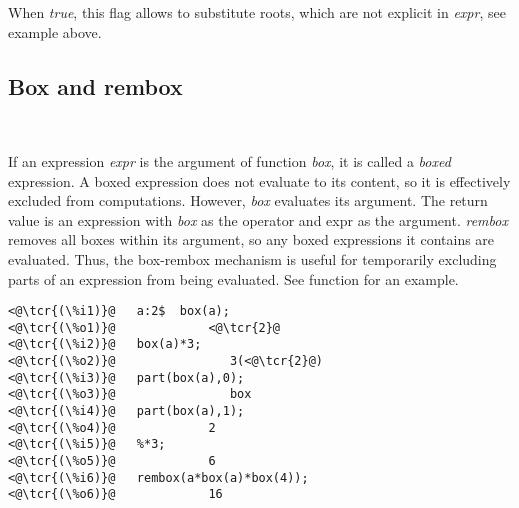 \documentclass[../Maxima_Workbook.tex]{subfiles}
\begin{document}
\lzz{} \qquad {} \hfill {}

\lz When \emph{true}, this flag allows  to substitute roots, which are not explicit in \emph{expr}, see example above.

\subsection{Box and rembox}

\lz {} \hfill \tcr{[function]} \\
 \hfill \tcr{[function]}

\lz If an expression \emph{expr} is the argument of function \emph{box}, it is called a \emph{boxed} expression. A boxed expression does not evaluate to its content, so it is effectively excluded from computations. However, \emph{box} evaluates its argument. The return value is an expression with \emph{box} as the operator and expr as the argument. \emph{rembox} removes all boxes within its argument, so any boxed expressions it contains are evaluated. Thus, the box-rembox mechanism is useful for temporarily excluding parts of an expression from being evaluated. See function  for an example.

\lz \begin{lstlisting}
<@\tcr{(\%i1)}@   a:2$  box(a);
<@\tcr{(\%o1)}@				<@\tcr{2}@
<@\tcr{(\%i2)}@   box(a)*3;
<@\tcr{(\%o2)}@			       3(<@\tcr{2}@)
<@\tcr{(\%i3)}@   part(box(a),0);
<@\tcr{(\%o3)}@			       box
<@\tcr{(\%i4)}@   part(box(a),1);
<@\tcr{(\%o4)}@				2
<@\tcr{(\%i5)}@   %*3;
<@\tcr{(\%o5)}@				6
<@\tcr{(\%i6)}@   rembox(a*box(a)*box(4));
<@\tcr{(\%o6)}@				16
\end{lstlisting}
\end{document}
